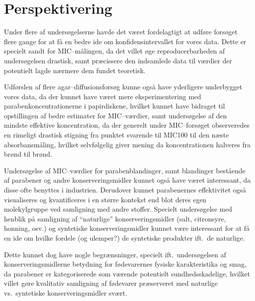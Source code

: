 \section{Perspektivering}
Under flere af undersøgelserne havde det været fordelagtigt at udføre forsøget flere gange for at få en bedre ide om konfidensintervallet for vores data. Dette er specielt sandt for MIC--målingen, da det villet øge reproducerbarheden af undersøgelsen drastisk, samt præcissere den indsamlede data til værdier der potentielt lagde nærmere dem fundet teoretisk.

Udførslen af flere agar--diffusionsforsøg kunne også have yderligere underbygget vores data, da der kunnet have været mere eksperimentering med parabenkoncentrationerne i papirdiskene, hvilket kunnet have bidraget til opstillingen af bedre estimater for MIC--værdier, samt undersøgelse af den mindste effektive koncentration, da der generelt under MIC--forsøget observeredes en rimeligt drastisk stigning fra punktet svarende til MIC100 til den næste absorbansmåling, hvilket selvfølgelig giver mening da koncentrationen halveres fra brønd til brønd.

Undersøgelse af MIC--værdier for parabenblandinger, samt blandinger bestående af parabener og andre konserveringsmidler kunnet også have været interessant, da disse ofte benyttes i industrien. Derudover kunnet parabenernes effektivitet også visualiseres og kvantificeres i en større kontekst end blot deres egen molekylgruppe ved samligning med andre stoffer. Specielt undersøgelse med henblik på samligning af ``naturlige'' konserveringsmidler (salt, citronsyre, honning, osv.) og syntetiske konserveringsmidler kunnet være interessant for at få en ide om hvilke fordele (og ulemper?) de syntetiske produkter ift.\ de naturlige.

Dette kunnet dog have nogle begrænsninger, specielt ift.\ undersøgelsen af konserveringsmidlerne betydning for fødevarernes fysiske karakteristika og smag, da parabener er kategoriserede som værende potentielt sundhedsskadelige, hvilket villet gøre kvalitativ samligning af fødevarer præserveret med naturlige vs.\ syntetiske konserveringsmidler svært.
